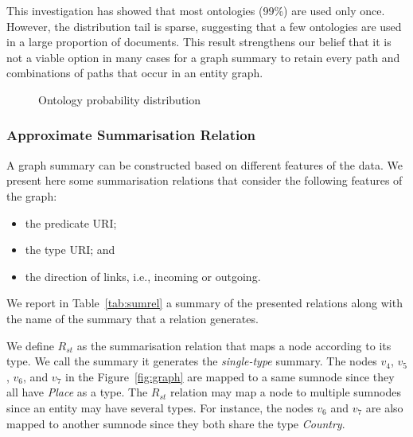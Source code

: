 This investigation has showed that most ontologies (99\%) are used only once. However, the distribution tail is sparse, suggesting that a few ontologies are used in a large proportion of documents.
This result strengthens our belief that it is not a viable option in many cases for a graph summary to retain every path and combinations of paths that occur in an entity graph.

\begin{figure}
	\centering
	
	\caption{Ontology probability distribution}
	\label{fig:onto-dist}
\end{figure}


\subsubsection{Approximate Summarisation Relation}

A graph summary can be constructed based on different features of the data. We present here some summarisation relations that consider the following features of the graph:
\begin{itemize}
	\item the predicate URI;
	\item the type URI; and
	\item the direction of links, i.e., incoming or outgoing.
\end{itemize}
We report in Table~\ref{tab:sumrel} a summary of the presented relations along with the name of the summary that a relation generates.


We define $R_{st}$ as the summarisation relation that maps a node according to its type. We call the summary it generates the \emph{single-type} summary.
The nodes $v_4$, $v_5$, $v_6$, and $v_7$ in the Figure~\ref{fig:graph} are mapped to a same sumnode since they all have \emph{Place} as a type. The $R_{st}$ relation may map a node to multiple sumnodes since an entity may have several types. For instance, the nodes $v_6$ and $v_7$ are also mapped to another sumnode since they both share the type \emph{Country}.

